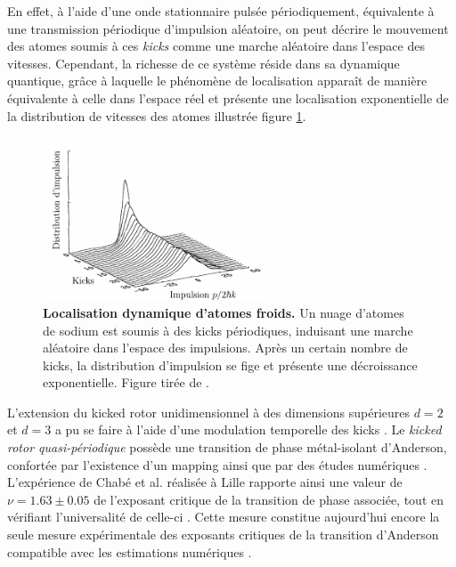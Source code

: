 En effet, à l'aide d'une onde stationnaire pulsée périodiquement, équivalente à une transmission périodique d'impulsion aléatoire, on peut décrire le mouvement des atomes soumis à ces \emph{kicks} comme une marche aléatoire dans l'espace des vitesses. Cependant, la richesse de ce système réside dans sa dynamique quantique, grâce à laquelle le phénomène de localisation apparaît de manière équivalente à celle dans l'espace réel et présente une localisation exponentielle de la distribution de vitesses des atomes illustrée figure \ref{fig:kicked_rotors}.

\begin{figure}
\centering
\includegraphics[width=0.6\textwidth]{Fig/Localisation/kicked_rotor.pdf}
\caption{\textbf{Localisation dynamique d'atomes froids.} Un nuage d'atomes de sodium est soumis à des kicks périodiques, induisant une marche aléatoire dans l'espace des impulsions. Après un certain nombre de kicks, la distribution d'impulsion se fige et présente une décroissance exponentielle. Figure tirée de \citep{moore1995atom}. }
\label{fig:kicked_rotors}
\end{figure}

L'extension du kicked rotor unidimensionnel à des dimensions supérieures $d=2$ et $d=3$ a pu se faire à l'aide d'une modulation temporelle des kicks \citep{casati1989anderson}. Le \emph{kicked rotor quasi-périodique} possède une transition de phase métal-isolant d'Anderson, confortée par l'existence d'un mapping \citep{lemarie2009observation} ainsi que par des études numériques \citep{lemarie2009universality}. L'expérience de Chabé et al. \citep{chabe2008experimental} réalisée à Lille rapporte ainsi une valeur de $\nu=1.63\pm0.05$ de l'exposant critique de la transition de phase associée, tout en vérifiant l'universalité de celle-ci \citep{lopez2012experimental}. Cette mesure constitue aujourd'hui encore la seule mesure expérimentale des exposants critiques de la transition d'Anderson compatible avec les estimations numériques \citep{slevin2014critical}.








